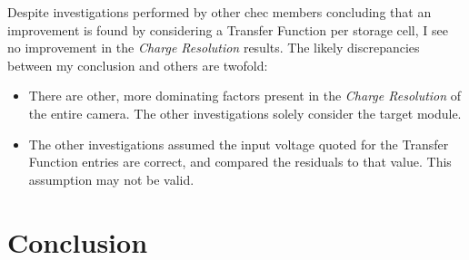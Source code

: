 Despite investigations performed by other \gls{chec} members concluding that an improvement is found by considering a Transfer Function per storage cell, I see no improvement in the \textit{Charge Resolution} results. The likely discrepancies between my conclusion and others are twofold:
\begin{itemize}
\item There are other, more dominating factors present in the \textit{Charge Resolution} of the entire camera. The other investigations solely consider the \gls{target} module.
\item The other investigations assumed the input voltage quoted for the Transfer Function entries are correct, and compared the residuals to that value. This assumption may not be valid.
\end{itemize}



\section{Conclusion}


